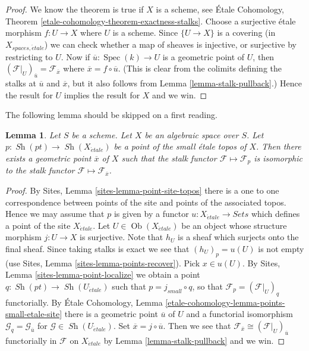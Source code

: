 \documentclass{stacks-project}
\theoremstyle{plain}
\newtheorem{lemma}[subsection]{Lemma}
\theoremstyle{definition}
\theoremstyle{remark}
\numberwithin{equation}{subsection}
\def\Spec{\mathop{\mathrm{Spec}}}
\def\Ob{\mathop{\mathrm{Ob}}\nolimits}
\def\Sh{\mathop{\mathit{Sh}}\nolimits}
\def\etale{{\acute{e}tale}}
\begin{document}
\begin{proof}
We know the theorem is true if $X$ is a scheme, see
\'Etale Cohomology, Theorem \ref{etale-cohomology-theorem-exactness-stalks}.
Choose a surjective \'etale morphism $f : U \to X$ where $U$ is a scheme.
Since $\{U \to X\}$ is a covering (in $X_{spaces, \etale}$) we can check
whether a map of sheaves is injective, or surjective by restricting
to $U$. Now if $\overline{u} : \Spec(k) \to U$ is a geometric
point of $U$, then
$(\mathcal{F}|_U)_{\overline{u}} = \mathcal{F}_{\overline{x}}$
where $\overline{x} = f \circ \overline{u}$. (This is clear from the
colimits defining the stalks at $\overline{u}$ and $\overline{x}$, but
it also follows from
Lemma \ref{lemma-stalk-pullback}.)
Hence the result for $U$ implies the result for $X$ and we win.
\end{proof}

\noindent
The following lemma should be skipped on a first reading.

\begin{lemma}
\label{lemma-points-small-etale-site}
Let $S$ be a scheme.
Let $X$ be an algebraic space over $S$.
Let $p : \Sh(pt) \to \Sh(X_\etale)$
be a point of the small \'etale topos of $X$.
Then there exists a geometric point $\overline{x}$ of $X$
such that the stalk functor $\mathcal{F} \mapsto \mathcal{F}_p$
is isomorphic to the stalk functor
$\mathcal{F} \mapsto \mathcal{F}_{\overline{x}}$.
\end{lemma}

\begin{proof}
By
Sites, Lemma \ref{sites-lemma-point-site-topos}
there is a one to one correspondence between points of the site and points
of the associated topos. Hence we may assume that $p$ is given by
a functor $u : X_\etale \to \textit{Sets}$ which defines a point
of the site $X_\etale$.
Let $U \in \Ob(X_\etale)$ be an object whose structure morphism
$j : U \to X$ is surjective. Note that $h_U$ is a sheaf
which surjects onto the final sheaf. Since taking stalks is exact
we see that $(h_U)_p = u(U)$ is not empty (use
Sites, Lemma \ref{sites-lemma-points-recover}).
Pick $x \in u(U)$. By
Sites, Lemma \ref{sites-lemma-point-localize}
we obtain a point $q : \Sh(pt) \to \Sh(U_\etale)$
such that $p = j_{small} \circ q$, so that
$\mathcal{F}_p = (\mathcal{F}|_U)_q$ functorially.
By
\'Etale Cohomology, Lemma \ref{etale-cohomology-lemma-points-small-etale-site}
there is a geometric point $\overline{u}$ of $U$ and a functorial
isomorphism $\mathcal{G}_q = \mathcal{G}_{\overline{u}}$
for $\mathcal{G} \in \Sh(U_\etale)$. Set
$\overline{x} = j \circ \overline{u}$. Then we see that
$\mathcal{F}_{\overline{x}} \cong (\mathcal{F}|_U)_{\overline{u}}$
functorially in $\mathcal{F}$ on $X_\etale$ by
Lemma \ref{lemma-stalk-pullback}
and we win.
\end{proof}
\end{document}

